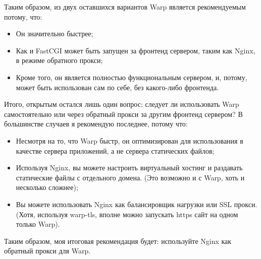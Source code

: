 %
Таким образом, из двух оставшихся вариантов Warp является рекомендуемым потому, что:
\begin{itemize}
  \item Он значительно быстрее;
  \item Как и FastCGI может быть запущен за фронтенд сервером, таким как Nginx, в режиме обратного прокси;
  \item Кроме того, он является полностью функциональным сервером, и, потому, может быть использован сам по себе, без какого-либо фронтенда.
\end{itemize}
%
%
%

Итого, открытым остался лишь один вопрос: следует ли использовать Warp самостоятельно или через обратный прокси за другим фронтенд сервером? В большинстве случаев я рекомендую последнее, потому что:
\begin{itemize}
  \item Несмотря на то, что Warp быстр, он оптимизирован для использования в качестве сервера приложений, а не сервера статических файлов;
  \item Используя Nginx, вы можете настроить виртуальный хостинг и раздавать статические файлы с отдельного домена. (Это возможно и с Warp, хоть и несколько сложнее);
  \item Вы можете использовать Nginx как балансировщик нагрузки или SSL прокси. (Хотя, используя warp-tls, вполне можно запускать https сайт на одном только Warp).
\end{itemize}

Таким образом, моя итоговая рекомендация будет: используйте Nginx как обратный прокси для Warp.

